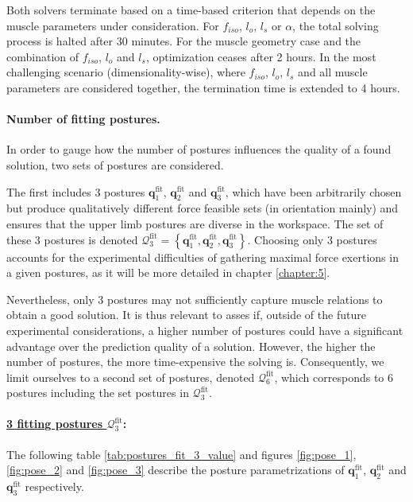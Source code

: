 Both solvers terminate based on a time-based criterion that depends on the muscle parameters under consideration. For $f_{iso}$, $l_o$, $l_s$ or $\alpha$, the total solving process is halted after 30 minutes. For the muscle geometry case and the combination of $f_{iso}$, $l_o$ and $l_s$, optimization ceases after 2 hours. In the most challenging scenario (dimensionality-wise), where $f_{iso}$, $l_o$, $l_s$ and all muscle parameters are considered together, the termination time is extended to 4 hours.

\paragraph*{Number of fitting postures.}
In order to gauge how the number of postures influences the quality of a found solution, two sets of postures are considered.

The first includes $3$ postures $\mathbf{q}_1^{\text{fit}}$, $\mathbf{q}_2^{\text{fit}}$ and $\mathbf{q}_3^{\text{fit}}$, which have been arbitrarily chosen but produce qualitatively different force feasible sets (in orientation mainly) and ensures that the upper limb postures are diverse in the workspace. The set of these $3$ postures is denoted $\mathcal{Q}_3^{\text{fit}}= \left\{\mathbf{q}_1^{\text{fit}}, \mathbf{q}_2^{\text{fit}}, \mathbf{q}_3^{\text{fit}}\right\}$. Choosing only $3$ postures accounts for the experimental difficulties of gathering maximal force exertions in a given postures, as it will be more detailed in chapter \ref{chapter:5}. 

Nevertheless, only 3 postures may not sufficiently capture muscle relations to obtain a good solution. It is thus relevant to asses if, outside of the future experimental considerations, a higher number of postures could have a significant advantage over the prediction quality of a solution. However, the higher the number of postures, the more time-expensive the solving is. Consequently, we limit ourselves to a second set of postures, denoted $\mathcal{Q}_6^{\text{fit}}$, which corresponds to $6$ postures including the set postures in $\mathcal{Q}_3^{\text{fit}}$.

\paragraph*{\underline{3 fitting postures $\mathcal{Q}_3^{\text{fit}}$}:}
The following table \ref{tab:postures_fit_3_value} and figures \ref{fig:pose_1}, \ref{fig:pose_2} and \ref{fig:pose_3} describe the posture parametrizations of $\mathbf{q}_1^{\text{fit}}$, $\mathbf{q}_2^{\text{fit}}$ and $\mathbf{q}_3^{\text{fit}}$ respectively.

